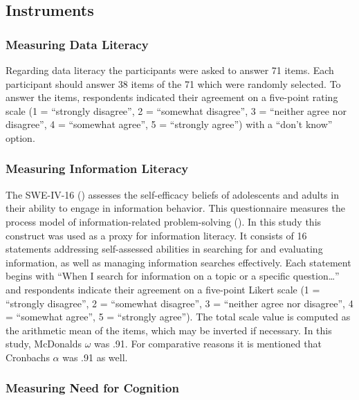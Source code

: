 \documentclass[
  12pt,
  a4paper,
  twoside]{article}
\begin{document}
\subsection{Instruments}\label{instruments}

\subsubsection{Measuring Data Literacy}\label{measuring-data-literacy}

Regarding data literacy the participants were asked to answer 71 items.
Each participant should answer 38 items of the 71 which were randomly selected.
To answer the items, respondents indicated their agreement on a five-point rating
scale (1 = ``strongly disagree'', 2 = ``somewhat disagree'', 3 = ``neither agree nor disagree'', 4 = ``somewhat agree'', 5 = ``strongly agree'') with a ``don't know'' option.

\subsubsection{Measuring Information Literacy}\label{measuring-information-literacy}

The SWE-IV-16 () assesses the self-efficacy beliefs of adolescents and adults in their ability to engage in information behavior.
This questionnaire measures the process model of information-related problem-solving
(). In this study this construct was used as a proxy for information literacy.
It consists of 16 statements addressing self-assessed abilities in searching for and evaluating information, as well as managing
information searches effectively.
Each statement begins with ``When I search for information on a topic or a specific question\ldots{}'' and respondents indicate their
agreement on a five-point Likert scale (1 = ``strongly disagree'', 2 = ``somewhat disagree'', 3 = ``neither agree nor disagree'', 4 = ``somewhat agree'', 5 = ``strongly agree''). The total scale value is computed as the arithmetic mean of the items, which may be inverted if necessary.
In this study, McDonalds \(\omega\) was .91. For comparative reasons it is mentioned that Cronbachs \(\alpha\) was .91 as well.

\subsubsection{Measuring Need for Cognition}\label{measuring-need-for-cognition}
\end{document}
